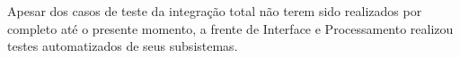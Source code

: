 Apesar dos casos de teste da integração total não terem sido realizados por completo até o presente momento,
a frente de Interface e Processamento realizou testes automatizados de seus subsistemas.










